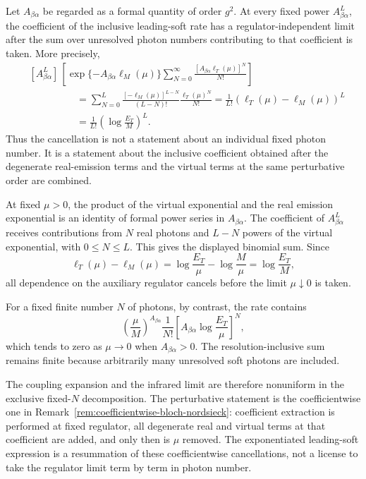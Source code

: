 \begin{remark}
\label{rem:coefficientwise-bloch-nordsieck}
Let \(A_{\beta\alpha}\) be regarded as a formal quantity of order \(g^2\).
At every fixed power \(A_{\beta\alpha}^L\), the coefficient of the inclusive
leading-soft rate has a regulator-independent limit after the sum over
unresolved photon numbers contributing to that coefficient is taken.  More
precisely,
\[
\begin{aligned}
  &[A_{\beta\alpha}^L]\,
  \left[
    \exp\{-A_{\beta\alpha}\ell_M(\mu)\}
    \sum_{N=0}^{\infty}
    \frac{\left[A_{\beta\alpha}\ell_T(\mu)\right]^N}{N!}
  \right]
\\
  &\hspace{2cm}=
  \sum_{N=0}^{L}
  \frac{[-\ell_M(\mu)]^{L-N}}{(L-N)!}
  \frac{\ell_T(\mu)^N}{N!}
  =
  \frac{1}{L!}
  \left(\ell_T(\mu)-\ell_M(\mu)\right)^L
\\
  &\hspace{2cm}=
  \frac{1}{L!}
  \left(\log\frac{E_T}{M}\right)^L .
\end{aligned}
\]
Thus the cancellation is not a statement about an individual fixed photon
number.  It is a statement about the inclusive coefficient obtained after the
degenerate real-emission terms and the virtual terms at the same perturbative
order are combined.

At fixed \(\mu>0\), the product of the virtual exponential and the real
emission exponential is an identity of formal power series in
\(A_{\beta\alpha}\).  The coefficient of \(A_{\beta\alpha}^L\) receives
contributions from \(N\) real photons and \(L-N\) powers of the virtual
exponential, with \(0\le N\le L\).  This gives the displayed binomial sum.
Since
\[
  \ell_T(\mu)-\ell_M(\mu)
  =
  \log\frac{E_T}{\mu}-\log\frac{M}{\mu}
  =
  \log\frac{E_T}{M},
\]
all dependence on the auxiliary regulator cancels before the limit
\(\mu\downarrow0\) is taken.
\end{remark}

For a fixed finite number \(N\) of photons, by contrast, the rate contains
\[
  \left(\frac{\mu}{M}\right)^{A_{\beta\alpha}}
  \frac1{N!}
  \left[
    A_{\beta\alpha}\log\frac{E_T}{\mu}
  \right]^N ,
\]
which tends to zero as \(\mu\to0\) when \(A_{\beta\alpha}>0\).  The
resolution-inclusive sum remains finite because arbitrarily many unresolved
soft photons are included.

The coupling expansion and the infrared limit are therefore nonuniform in the
exclusive fixed-\(N\) decomposition.  The perturbative statement is the
coefficientwise one in
Remark~\ref{rem:coefficientwise-bloch-nordsieck}: coefficient extraction
is performed at fixed regulator, all degenerate real and virtual terms at that
coefficient are added, and only then is \(\mu\) removed.  The exponentiated
leading-soft expression is a resummation of these coefficientwise
cancellations, not a license to take the regulator limit term by term in
photon number.

